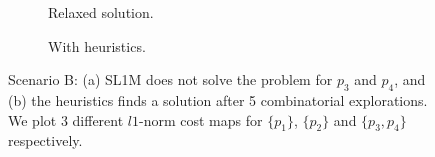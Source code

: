 \begin{figure}[h!]
\begin{subfigure}[t]{0.9\linewidth}
        \caption{Relaxed solution.}
        \label{fig:sl1m:final:0}
    \end{subfigure}
    \begin{subfigure}[t]{0.9\linewidth}
        \caption{With heuristics.}
        \label{fig:sl1m:final:1}
    \end{subfigure}
    \caption{Scenario B: (a) SL1M does not solve the problem for $p_3$ and $p_4$, and (b) the heuristics finds a solution after 5 combinatorial explorations. We plot 3 different $l1$-norm cost maps for $\{p_1\}$, $\{p_2\}$ and $\{p_3,p_4\}$ respectively.}
    \label{fig:sl1m:final}
\end{figure}

